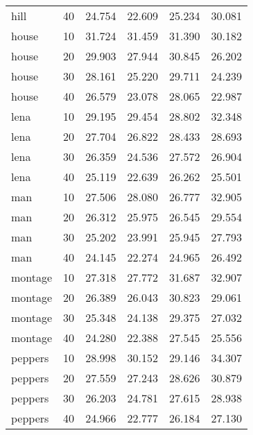 \begin{tabular}{lrrrrr}
        hill &     40 &   24.754 &  22.609 &  25.234 &  30.081 \\
       house &     10 &   31.724 &  31.459 &  31.390 &  30.182 \\
       house &     20 &   29.903 &  27.944 &  30.845 &  26.202 \\
       house &     30 &   28.161 &  25.220 &  29.711 &  24.239 \\
       house &     40 &   26.579 &  23.078 &  28.065 &  22.987 \\
        lena &     10 &   29.195 &  29.454 &  28.802 &  32.348 \\
        lena &     20 &   27.704 &  26.822 &  28.433 &  28.693 \\
        lena &     30 &   26.359 &  24.536 &  27.572 &  26.904 \\
        lena &     40 &   25.119 &  22.639 &  26.262 &  25.501 \\
         man &     10 &   27.506 &  28.080 &  26.777 &  32.905 \\
         man &     20 &   26.312 &  25.975 &  26.545 &  29.554 \\
         man &     30 &   25.202 &  23.991 &  25.945 &  27.793 \\
         man &     40 &   24.145 &  22.274 &  24.965 &  26.492 \\
     montage &     10 &   27.318 &  27.772 &  31.687 &  32.907 \\
     montage &     20 &   26.389 &  26.043 &  30.823 &  29.061 \\
     montage &     30 &   25.348 &  24.138 &  29.375 &  27.032 \\
     montage &     40 &   24.280 &  22.388 &  27.545 &  25.556 \\
     peppers &     10 &   28.998 &  30.152 &  29.146 &  34.307 \\
     peppers &     20 &   27.559 &  27.243 &  28.626 &  30.879 \\
     peppers &     30 &   26.203 &  24.781 &  27.615 &  28.938 \\
     peppers &     40 &   24.966 &  22.777 &  26.184 &  27.130 \\
\bottomrule
\end{tabular}
